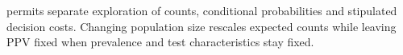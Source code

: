  permits separate exploration of counts, conditional probabilities and stipulated decision costs. Changing population size rescales expected counts while leaving PPV fixed when prevalence and test characteristics stay fixed.
